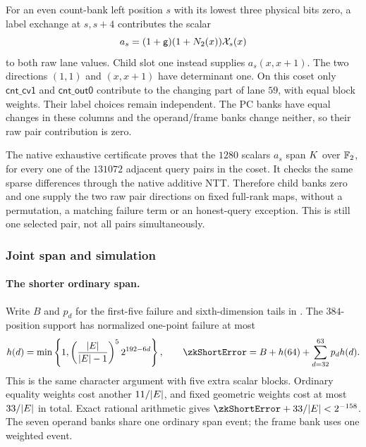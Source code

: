 For an even count-bank left position $s$ with its lowest three physical bits zero, a label exchange at $s,s+4$ contributes the scalar
\[
 a_s=(1+\mathsf{g})(1+N_2(x))\mathcal{X}_s(x)
\]
to both raw lane values. Child slot one instead supplies $a_s(x,x+1)$. The two directions $(1,1)$ and $(x,x+1)$ have determinant one. On this coset only $\mathsf{cnt\_cv1}$ and $\mathsf{cnt\_out0}$ contribute to the changing part of lane $59$, with equal block weights. Their label choices remain independent. The PC banks have equal changes in these columns and the operand/frame banks change neither, so their raw pair contribution is zero.

The native exhaustive certificate proves that the $1280$ scalars $a_s$ span $K$ over $\mathbb{F}_2$, for every one of the $131072$ adjacent query pairs in the coset. It checks the same sparse differences through the native additive NTT. Therefore child banks zero and one supply the two raw pair directions on fixed full-rank maps, without a permutation, a matching failure term or an honest-query exception. This is still one selected pair, not all pairs simultaneously.

\subsubsection{Joint span and simulation}

\paragraph{The shorter ordinary span.} Write $B$ and $p_d$ for the first-five failure and sixth-dimension tails in . The $384$-position support has normalized one-point failure at most
\[
 h(d)=\min\left\{1,\left(\frac{|\E|}{|\E|-1}\right)^5 2^{192-6d}\right\},
 \qquad \zkShortError=B+h(64)+\sum_{d=32}^{63}p_dh(d).
\]
This is the same character argument with five extra scalar blocks. Ordinary equality weights cost another $11/|E|$, and fixed geometric weights cost at most $33/|E|$ in total. Exact rational arithmetic gives $\zkShortError+33/|\E|<2^{-158}$. The seven operand banks share one ordinary span event; the frame bank uses one weighted event.

